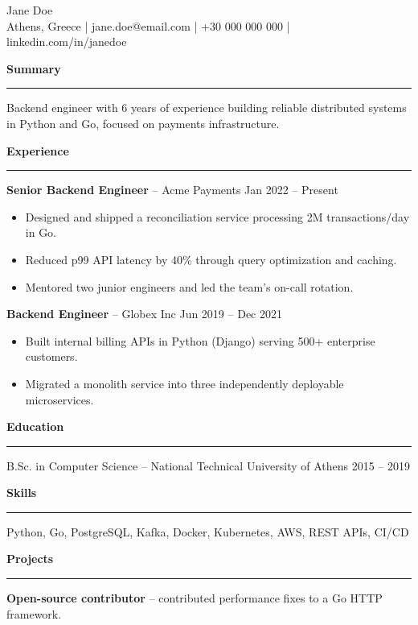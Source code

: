 \documentclass[11pt]{article}
\newcommand{\sechead}[1]{\vspace{8pt}\noindent\textbf{\large #1}\\\rule{\linewidth}{0.5pt}}
\begin{document}
\begin{center}
  {\LARGE Jane Doe} \\
  Athens, Greece \quad | \quad jane.doe@email.com \quad | \quad +30 000 000 000 \quad | \quad linkedin.com/in/janedoe
\end{center}

\sechead{Summary}
Backend engineer with 6 years of experience building reliable distributed systems in
Python and Go, focused on payments infrastructure.

\sechead{Experience}
\textbf{Senior Backend Engineer} -- Acme Payments \hfill Jan 2022 -- Present \\
\begin{itemize}[leftmargin=*, nosep]
  \item Designed and shipped a reconciliation service processing 2M transactions/day in Go.
  \item Reduced p99 API latency by 40\% through query optimization and caching.
  \item Mentored two junior engineers and led the team's on-call rotation.
\end{itemize}

\textbf{Backend Engineer} -- Globex Inc \hfill Jun 2019 -- Dec 2021 \\
\begin{itemize}[leftmargin=*, nosep]
  \item Built internal billing APIs in Python (Django) serving 500+ enterprise customers.
  \item Migrated a monolith service into three independently deployable microservices.
\end{itemize}

\sechead{Education}
B.Sc. in Computer Science -- National Technical University of Athens \hfill 2015 -- 2019

\sechead{Skills}
Python, Go, PostgreSQL, Kafka, Docker, Kubernetes, AWS, REST APIs, CI/CD

\sechead{Projects}
\textbf{Open-source contributor} -- contributed performance fixes to a Go HTTP framework.
\end{document}
